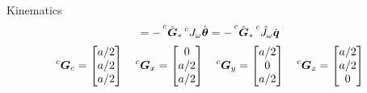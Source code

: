 \begin{frame}[shrink=15]{Kinematics}
\[  = -\prescript{c}{}{\unitvec{G}}_* \prescript{c}{}{J_{\omega}} \dot{\vec{\theta}}
  = -\prescript{c}{}{\unitvec{G}}_* \prescript{c}{}{\tilde{J}_{\omega}} \dot{\vec{q}}
  \]
  \[
  \prescript{c}{}{\vec{G}}_{c} = 
  \begin{bmatrix}
    a/2 \\
    a/2 \\
    a/2
  \end{bmatrix} \quad
  \prescript{c}{}{\vec{G}}_x = 
  \begin{bmatrix}
    0 \\
    a/2 \\
    a/2
  \end{bmatrix} \quad
  \prescript{c}{}{\vec{G}}_y = 
  \begin{bmatrix}
    a/2 \\
    0 \\
    a/2
  \end{bmatrix} \quad
  \prescript{c}{}{\vec{G}}_z = 
  \begin{bmatrix}
    a/2 \\
    a/2 \\
    0
  \end{bmatrix}
  \]
\end{frame}

